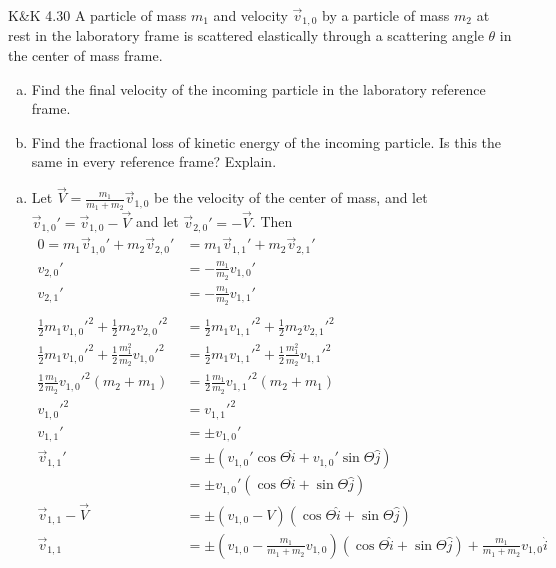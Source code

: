\documentclass{esg8012pset}
\begin{document}
\begin{problem}{K\&K 4.30}
  A particle of mass $m_1$ and velocity $\vec v_{1,0}$ by a particle of mass $m_2$ at rest in the laboratory frame is scattered elastically through a scattering angle $\theta$ in the center of mass frame.
  \begin{enumerate}[(a)]
    \item Find the final velocity of the incoming particle in the laboratory reference frame.
    \item Find the fractional loss of kinetic energy of the incoming particle. Is this the same in every reference frame? Explain.
  \end{enumerate}
\end{problem}
\begin{solution}
  \begin{enumerate}[a)]
    \item Let $\vec V = \frac{m_1}{m_1 + m_2}\vec v_{1,0}$ be the velocity of the center of mass, and let $\vec v_{1,0}' = \vec v_{1, 0} - \vec V$ and let $\vec v_{2, 0}' = -\vec V$.  Then \begin{align*}
    0 = m_1\vec v_{1, 0}' + m_2\vec v_{2,0}' & = m_1\vec v_{1, 1}' + m_2\vec v_{2,1}' \\
    v_{2, 0}' & = -\frac{m_1}{m_2} v_{1,0}' \\
    v_{2, 1}' & = -\frac{m_1}{m_2} v_{1,1}' \\
    \\
    \frac{1}{2}m_1 v_{1, 0}'^2 + \frac{1}{2}m_2 v_{2, 0}'^2 & = \frac{1}{2}m_1 v_{1, 1}'^2 + \frac{1}{2}m_2 v_{2, 1}'^2 \\
    \frac{1}{2}m_1 v_{1, 0}'^2 + \frac{1}{2}\frac{m_1^2}{m_2} v_{1,0}'^2 & = \frac{1}{2}m_1 v_{1, 1}'^2 + \frac{1}{2}\frac{m_1^2}{m_2} v_{1,1}'^2 \\
    \frac{1}{2}\frac{m_1}{m_2} v_{1, 0}'^2(m_2 + m_1) & = \frac{1}{2}\frac{m_1}{m_2} v_{1, 1}'^2(m_2 + m_1) \\
    v_{1, 0}'^2 & = v_{1, 1}'^2 \\
    v_{1, 1}' & = \pm v_{1,0}' \\
    \vec v_{1, 1}' & = \pm (v_{1,0}'\cos\Theta\hat i + v_{1,0}'\sin\Theta \hat j) \\
    & = \pm v_{1,0}'(\cos\Theta\hat i + \sin\Theta \hat j) \\
    \vec v_{1, 1} - \vec V & = \pm (v_{1,0} - V)(\cos\Theta\hat i + \sin\Theta \hat j) \\
    \vec v_{1, 1} & = \pm \left(v_{1,0} - \frac{m_1}{m_1 + m_2} v_{1,0}\right)(\cos\Theta\hat i + \sin\Theta \hat j) + \frac{m_1}{m_1 + m_2}v_{1,0}\hat i \\

\end{align*}
\end{enumerate}
\end{solution}
\end{document}

